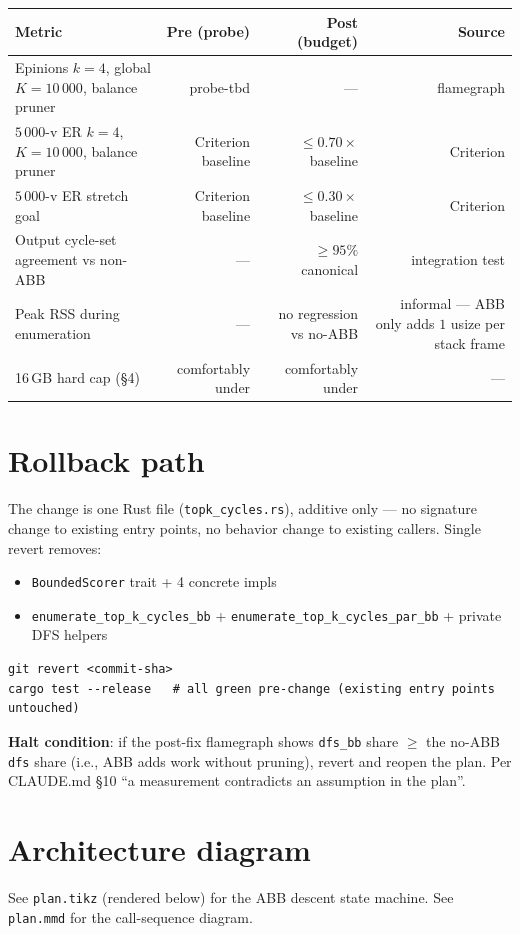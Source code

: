 \documentclass[a4paper,11pt]{article}
\begin{document}
\begin{center}
\begin{tabular}{lrrr}
\toprule
Metric & Pre (probe) & Post (budget) & Source \\
\midrule
Epinions $k{=}4$, global $K{=}10\,000$, balance pruner & probe-tbd & --- & flamegraph \\
$5\,000$-v ER $k{=}4$, $K{=}10\,000$, balance pruner & Criterion baseline & $\le 0.70 \times$ baseline & Criterion \\
$5\,000$-v ER stretch goal & Criterion baseline & $\le 0.30 \times$ baseline & Criterion \\
Output cycle-set agreement vs non-ABB & --- & $\ge 95\%$ canonical & integration test \\
Peak RSS during enumeration & --- & no regression vs no-ABB & informal --- ABB only adds $1$ usize per stack frame \\
16\,GB hard cap (\S4) & comfortably under & comfortably under & --- \\
\bottomrule
\end{tabular}
\end{center}

\section*{Rollback path}

The change is one Rust file (\texttt{topk\_cycles.rs}), additive only ---
no signature change to existing entry points, no behavior change to
existing callers. Single revert removes:
\begin{itemize}
  \item \texttt{BoundedScorer} trait + 4 concrete impls
  \item \texttt{enumerate\_top\_k\_cycles\_bb} +
    \texttt{enumerate\_top\_k\_cycles\_par\_bb} + private DFS helpers
\end{itemize}

\begin{lstlisting}
git revert <commit-sha>
cargo test --release   # all green pre-change (existing entry points untouched)
\end{lstlisting}

\textbf{Halt condition}: if the post-fix flamegraph shows
\texttt{dfs\_bb} share $\ge$ the no-ABB \texttt{dfs} share (i.e., ABB
adds work without pruning), revert and reopen the plan. Per
CLAUDE.md \S10 ``a measurement contradicts an assumption in the
plan''.

\section*{Architecture diagram}

See \texttt{plan.tikz} (rendered below) for the ABB descent state
machine. See \texttt{plan.mmd} for the call-sequence diagram.

\begin{center}

\end{center}
\end{document}
